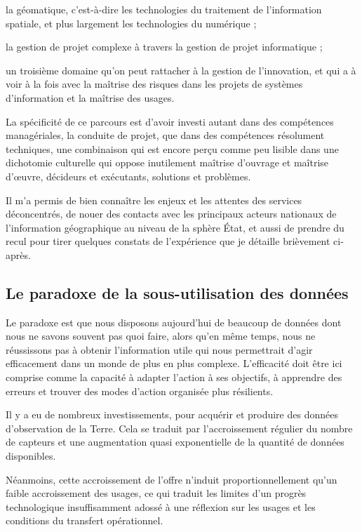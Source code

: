 \startitemize

\item la géomatique, c'est-à-dire les technologies du traitement de l'information
spatiale, et plus largement les technologies du numérique ;

\item la gestion de projet complexe à travers la gestion de projet informatique ;

\item un troisième domaine qu'on peut rattacher à la gestion de l’innovation, et qui
a à voir à la fois avec la maîtrise des risques dans les projets de systèmes
d'information et la maîtrise des usages.

\stopitemize

La spécificité de ce parcours est d'avoir investi autant dans des compétences
managériales, la conduite de projet, que dans des compétences résolument
techniques, une combinaison qui est encore perçu comme peu lisible dans une
dichotomie culturelle qui oppose inutilement maîtrise d'ouvrage et maîtrise
d’œuvre, décideurs et exécutants, solutions et problèmes.

Il m’a permis de bien connaître les enjeux et les attentes des services
déconcentrés, de nouer des contacts avec les principaux acteurs nationaux de
l’information géographique au niveau de la sphère État, et aussi de prendre du
recul pour tirer quelques constats de l’expérience que je détaille brièvement
ci-après.


\subsection
{Le paradoxe de la sous-utilisation des données}

Le paradoxe est que nous disposons aujourd'hui de beaucoup de données dont
nous ne savons souvent pas quoi faire, alors qu'en même temps, nous ne
réussissons pas à obtenir l'information utile qui nous permettrait d'agir
efficacement dans un monde de plus en plus complexe. L'efficacité doit être
ici comprise comme la capacité à adapter l'action à ses objectifs, à apprendre
des erreurs et trouver des modes d'action organisée plus résilients.

Il y a eu de nombreux investissements, pour acquérir et produire des données
d'observation de la Terre. Cela se traduit par l'accroissement régulier du
nombre de capteurs et une augmentation quasi exponentielle de la quantité de
données disponibles.

Néanmoins, cette accroissement de l'offre n'induit proportionnellement qu'un
faible accroissement des usages, ce qui traduit les limites d'un progrès
technologique insuffisamment adossé à une réflexion sur les usages et les
conditions du transfert opérationnel.

